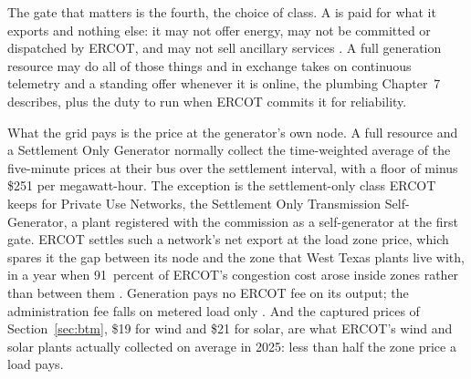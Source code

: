 The gate that matters is the fourth, the choice of class. A  is paid for what it exports and nothing else: it may not offer energy, may not be committed or dispatched by ERCOT, and may not sell ancillary services \autocite{ercot2026protocols}. %
A full generation resource may do all of those things and in exchange takes on continuous telemetry and a standing offer whenever it is online, the plumbing Chapter~7 describes, plus the duty to run when ERCOT commits it for reliability.

What the grid pays is the price at the generator's own node. A full resource and a Settlement Only Generator normally collect the time-weighted average of the five-minute prices at their bus over the settlement interval, with a floor of minus \$251 per megawatt-hour. The exception is the settlement-only class ERCOT keeps for Private Use Networks, the Settlement Only Transmission Self-Generator, a plant registered with the commission as a self-generator at the first gate. ERCOT settles such a network's net export at the load zone price, which spares it the gap between its node and the zone that West Texas plants live with, in a year when 91~percent of ERCOT's congestion cost arose inside zones rather than between them \autocite{ercot2026protocols,potomac2026somercot}. %
Generation pays no ERCOT fee on its output; the administration fee falls on metered load only \autocite{ercot2026protocols}. %
And the captured prices of Section~\ref{sec:btm}, \$19 for wind and \$21 for solar, are what ERCOT's wind and solar plants actually collected on average in 2025: less than half the zone price a load pays. %

